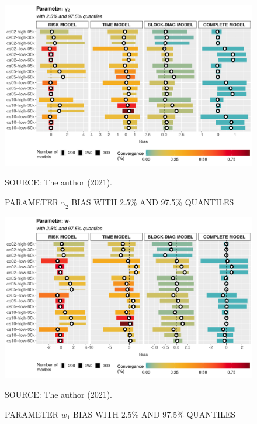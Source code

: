 \documentclass[12pt, %
               openright, %
               oneside, %
               a4paper, %
               chapter=TITLE, %
               section=TITLE, %
               brazil,
               english %
]{abntex2}
\begin{document}
\begin{apendicesenv}
\begin{figure}[H]
 \setlength{\abovecaptionskip}{.0001pt}
 \caption{PARAMETER \(\gamma_{2}\) BIAS WITH 2.5\% AND 97.5\% QUANTILES}
 \vspace{0.2cm}\centering
 \includegraphics[width=\textwidth]{bias2plot-4.png}\\
 \begin{footnotesize}
  SOURCE: The author (2021).
 \end{footnotesize}
 \label{fig:biasgama2}
\end{figure}

\begin{figure}[H]
 \setlength{\abovecaptionskip}{.0001pt}
 \caption{PARAMETER \(w_{1}\) BIAS WITH 2.5\% AND 97.5\% QUANTILES}
 \vspace{0.2cm}\centering
 \includegraphics[width=\textwidth]{bias2plot-5.png}\\
 \begin{footnotesize}
  SOURCE: The author (2021).
 \end{footnotesize}
 \label{fig:biasw1}
\end{figure}


\end{apendicesenv}
\end{document}
